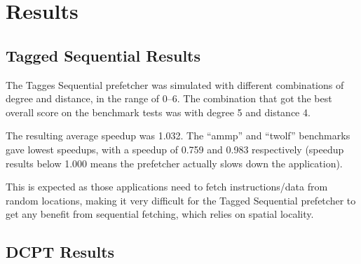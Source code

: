 \section{Results}

\subsection{Tagged Sequential Results}

The Tagges Sequential prefetcher was simulated with different combinations of
degree and distance, in the range of 0--6. The combination that got the best
overall score on the benchmark tests was with degree 5 and distance 4.

The resulting average speedup was 1.032. The ``ammp'' and ``twolf'' benchmarks
gave lowest speedups, with a speedup of 0.759 and 0.983 respectively (speedup
results below 1.000 means the prefetcher actually slows down the application).

This is expected as those applications need to fetch instructions/data from
random locations, making it very difficult for the Tagged Sequential prefetcher
to get any benefit from sequential fetching, which relies on spatial locality.

\subsection{DCPT Results}


